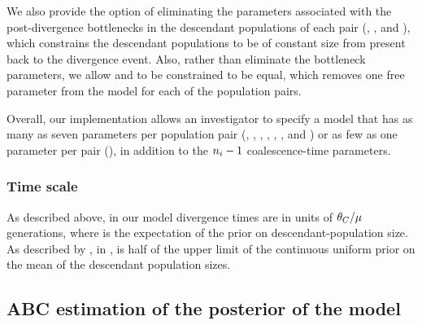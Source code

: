 We also provide the option of eliminating the parameters associated with the
post-divergence bottlenecks in the descendant populations of each pair
(\bottleTime{}, , and ),
which constrains the descendant populations to be of
constant size from present back to the divergence event.
Also, rather than eliminate the bottleneck parameters,
we allow  and  to be constrained to be
equal, which removes one free parameter from the model for each of the
population pairs.

Overall, our implementation allows an investigator to specify a model that has
as many as seven parameters per population pair
(\ancestralTheta{}, , ,
\bottleTime{}, , , and
\migrationRate{})
or as few as one parameter per pair
(\myTheta{}),
in addition to the $\popSampleSize{i}{} - 1$ coalescence-time parameters.

\subsubsection*{Time scale}
As described above, in our model divergence times are in units of
$\theta_{C}/\mu$ generations, where  is the expectation
of the prior on descendant-population size.
As described by \citet{Oaks2012}, in \msb,  is half of the upper
limit of the continuous uniform prior on the mean of the descendant population
sizes.

\subsection*{ABC estimation of the posterior of the model}
